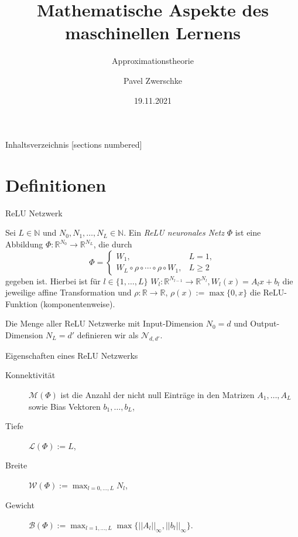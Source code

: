 \documentclass[10pt,aspectratio=169]{beamer}
\title{Mathematische Aspekte des maschinellen Lernens}
\subtitle{Approximationstheorie}
\date{19.11.2021}
\author{Pavel Zwerschke}
\institute{Karlsruher Institut für Technologie}
\newcommand{\N}{\mathbb{N}} %
\newcommand{\R}{\mathbb{R}} %
\newcommand{\set}[1]{\{#1\}}
\begin{document}
\maketitle

\begin{frame}{Inhaltsverzeichnis}
    [sections numbered]
    \tableofcontents%
\end{frame}

\section{Definitionen}

\begin{frame}{ReLU Netzwerk}
    \begin{definition}
        Sei \(L \in \N\) und \(N_0, N_1, \ldots, N_L \in \N\). Ein 
        \textit{ReLU neuronales Netz} \(\Phi\) ist eine Abbildung 
        \(\Phi: \R^{N_0} \rightarrow \R^{N_L}\), die durch 
        \[ \Phi = \begin{cases}
            W_1, & L = 1, \\
            W_L \circ \rho \circ \cdots \circ \rho \circ W_1, & L \geq 2
        \end{cases} \]
        gegeben ist. Hierbei ist für \(l\in \set{1,\ldots, L}\) \(W_l : \R^{N_{l-1}} \rightarrow \R^{N_l}, W_l(x) = A_l x + b_l\) 
        die jeweilige affine Transformation und \(\rho: \R \rightarrow \R\), \(\rho(x) := \max\set{0, x}\) 
        die ReLU-Funktion (komponentenweise).

        Die Menge aller ReLU Netzwerke mit Input-Dimension \(N_0 = d\) und Output-Dimension \(N_L = d'\) 
        definieren wir als \(\mathcal{N}_{d,d'}\).
    \end{definition}
\end{frame}

\begin{frame}{Eigenschaften eines ReLU Netzwerks}
    \begin{definition}
        \begin{description}
            \item[Konnektivität] \(\mathcal{M}(\Phi)\) ist die Anzahl der nicht null Einträge in den Matrizen \(A_1, \ldots, A_L\) 
            sowie Bias Vektoren \(b_1, \ldots, b_L\),
            \item[Tiefe] \(\mathcal{L}(\Phi) := L\),
            \item[Breite] \(\mathcal{W}(\Phi) := \max_{l=0,\ldots, L} N_l\),
            \item[Gewicht] \(\mathcal{B}(\Phi) := \max_{l=1,\ldots, L} \max\set{||A_l ||_\infty, ||b_l||_\infty}\).
        \end{description}
    \end{definition}
\end{frame}
\end{document}
